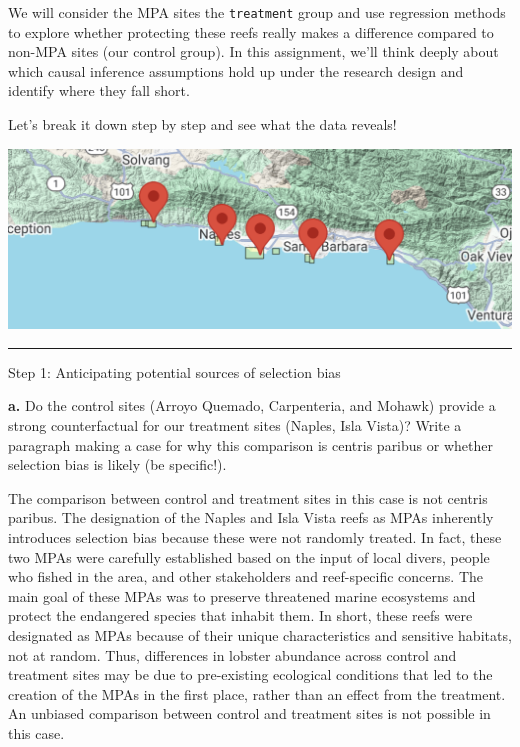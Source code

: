 \documentclass[
]{article}
\begin{document}
We will consider the MPA sites the \texttt{treatment} group and use
regression methods to explore whether protecting these reefs really
makes a difference compared to non-MPA sites (our control group). In
this assignment, we'll think deeply about which causal inference
assumptions hold up under the research design and identify where they
fall short.

Let's break it down step by step and see what the data reveals!

\includegraphics{figures/map-5reefs.png}

\begin{center}\rule{0.5\linewidth}{0.5pt}\end{center}

Step 1: Anticipating potential sources of selection bias

\textbf{a.} Do the control sites (Arroyo Quemado, Carpenteria, and
Mohawk) provide a strong counterfactual for our treatment sites (Naples,
Isla Vista)? Write a paragraph making a case for why this comparison is
centris paribus or whether selection bias is likely (be specific!).

The comparison between control and treatment sites in this case is not
centris paribus. The designation of the Naples and Isla Vista reefs as
MPAs inherently introduces selection bias because these were not
randomly treated. In fact, these two MPAs were carefully established
based on the input of local divers, people who fished in the area, and
other stakeholders and reef-specific concerns. The main goal of these
MPAs was to preserve threatened marine ecosystems and protect the
endangered species that inhabit them. In short, these reefs were
designated as MPAs because of their unique characteristics and sensitive
habitats, not at random. Thus, differences in lobster abundance across
control and treatment sites may be due to pre-existing ecological
conditions that led to the creation of the MPAs in the first place,
rather than an effect from the treatment. An unbiased comparison between
control and treatment sites is not possible in this case.
\end{document}
